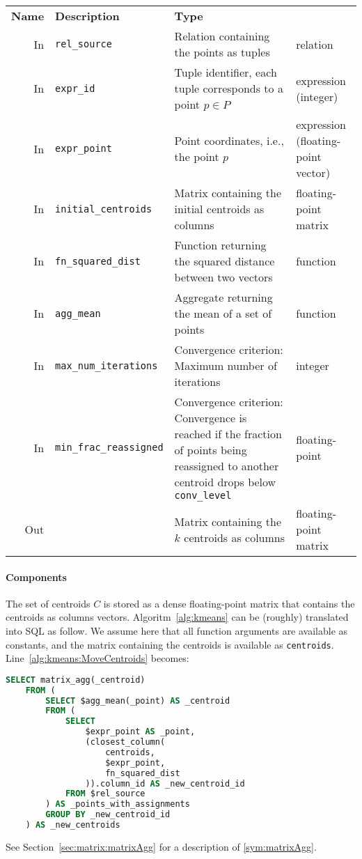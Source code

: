 \begin{center}
	\begin{tabularx}{\linewidth}{rlXl}
		\toprule%
		\textbf{Name} & \textbf{Description} & \textbf{Type}
		\\\otoprule
		In &
		\texttt{rel\_source} &
		Relation containing the points as tuples &
		relation
		\\\midrule
		In &
		\texttt{expr\_id} &
		Tuple identifier, each tuple corresponds to a point $p \in P$ &
		\specialcell{l}{expression\\ (integer)}
		\\\midrule
		In &
		\texttt{expr\_point} &
		Point coordinates, i.e., the point $p$ &
		\specialcell{l}{expression\\ (floating-point vector)}
		\\\midrule
		In &
		\texttt{initial\_centroids} &
		Matrix containing the initial centroids as columns &
		floating-point matrix
		\\\midrule
		In &
		\texttt{fn\_squared\_dist} &
		Function returning the squared distance between two vectors &
		function
		\\\midrule
		In &
		\texttt{agg\_mean} &
		Aggregate returning the mean of a set of points &
		function
		\\\midrule
		In &
		\texttt{max\_num\_iterations} &
		Convergence criterion: Maximum number of iterations &
		integer
		\\\midrule
		In &
		\texttt{min\_frac\_reassigned} &
		Convergence criterion: Convergence is reached if the fraction of points being reassigned to another centroid drops below \texttt{conv\_level} &
		floating-point
		\\\midrule
		Out & &
		Matrix containing the $k$ centroids as columns &
		floating-point matrix
		\\\bottomrule
	\end{tabularx}
\end{center}

\paragraph{Components}

The set of centroids $C$ is stored as a dense floating-point matrix that contains the centroids as columns vectors. Algoritm~\ref{alg:kmeans} can be (roughly) translated into SQL as follow. We assume here that all function arguments are available as constants, and the matrix containing the centroids is available as \texttt{centroids}. Line~\ref{alg:kmeans:MoveCentroids} becomes:
%
\begin{lstlisting}[language=SQL,gobble=4]
    SELECT matrix_agg(_centroid)
    FROM (
        SELECT $agg_mean(_point) AS _centroid
        FROM (
            SELECT
                $expr_point AS _point,
                (closest_column(
                    centroids,
                    $expr_point,
                    fn_squared_dist
                )).column_id AS _new_centroid_id
            FROM $rel_source
        ) AS _points_with_assignments
        GROUP BY _new_centroid_id
    ) AS _new_centroids
\end{lstlisting}
See Section~\ref{sec:matrix:matrixAgg} for a description of \ref{sym:matrixAgg}.

